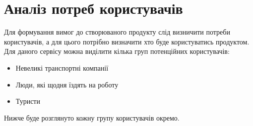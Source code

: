 \section{Аналіз потреб користувачів}
\label{sec:clients-analysis}


Для формування вимог до створюваного продукту слід визничити потреби користувачів, а для цього потрібно визначити хто буде користуватись продуктом. Для даного сервісу можна виділити кілька груп потенційних користувачів:

\begin{itemize}
    \item Невеликі транспортні компанії
    \item Люди, які щодня їздять на роботу
    \item Туристи
\end{itemize}

Нижче буде розглянуто кожну групу користувачів окремо.



